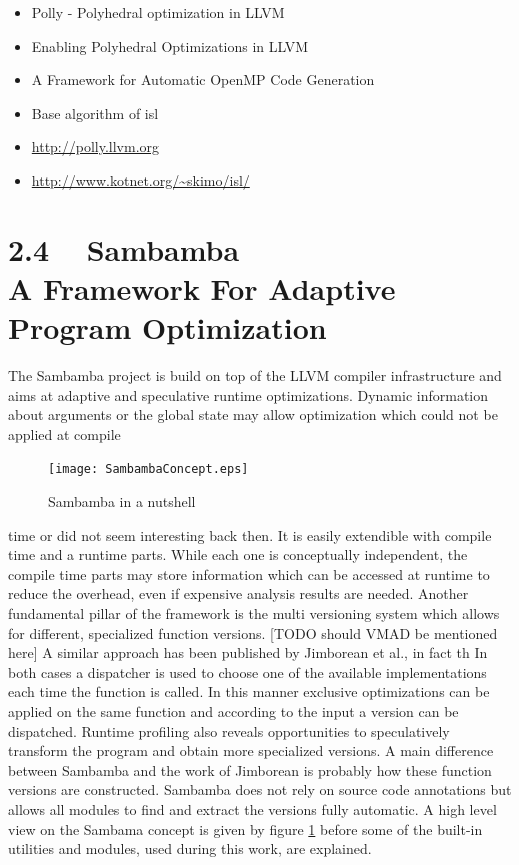 \yellow
\begin{itemize}
  \item Polly - Polyhedral optimization in LLVM \cite{grosser.11.impact}  
  \item Enabling Polyhedral Optimizations in LLVM \cite{grosser:thesis}
  \item A Framework for Automatic OpenMP Code Generation \cite{raghesh2011framework}
  \item Base algorithm of isl \cite{Bondhugula:2008:PAP:1379022.1375595}
  \item \url{http://polly.llvm.org} \nocite{Polly:Online}
  \item \url{http://www.kotnet.org/~skimo/isl/} \nocite{ISL:Online}
\end{itemize}





\section*{2.4 ~ Sambamba \\ A Framework For Adaptive Program Optimization}
The Sambamba project is build on top of the LLVM compiler infrastructure and 
aims at adaptive and speculative runtime optimizations.
Dynamic information about arguments or the global state may allow optimization
which could not be applied at compile 
\begin{figure}
  \centering
  \texttt{[image: SambambaConcept.eps]}
  \caption{Sambamba in a nutshell}
  \label{fig:SambambaConcept}  
\end{figure}
time or did not seem interesting back then. It is easily extendible with 
compile time and a runtime parts. While each one is conceptually 
independent, the compile time parts may store information which can be accessed
at runtime to reduce the overhead, even if expensive analysis results are needed. 
Another fundamental pillar of the framework is the multi versioning system which
allows for different, specialized function versions. [TODO should VMAD be mentioned here]
A similar approach has
been published by Jimborean et al.\cite{JIMBOREAN-2012-664345}, in fact th
In both cases a dispatcher is used to choose one of the available 
implementations each time the function is called. 
In this manner exclusive optimizations can be applied on the same function and
according to the input a version can be dispatched. Runtime profiling also 
reveals opportunities to speculatively transform the program and obtain more
specialized versions. A main difference between Sambamba and the work of 
Jimborean is probably how these function versions are constructed. Sambamba does
not rely on source code annotations but allows all modules to find and extract
the versions fully automatic. A high level view on the Sambama concept is given
by figure \ref{fig:SambambaConcept} before some of the  built-in utilities 
and modules, used during this work, are explained. 


